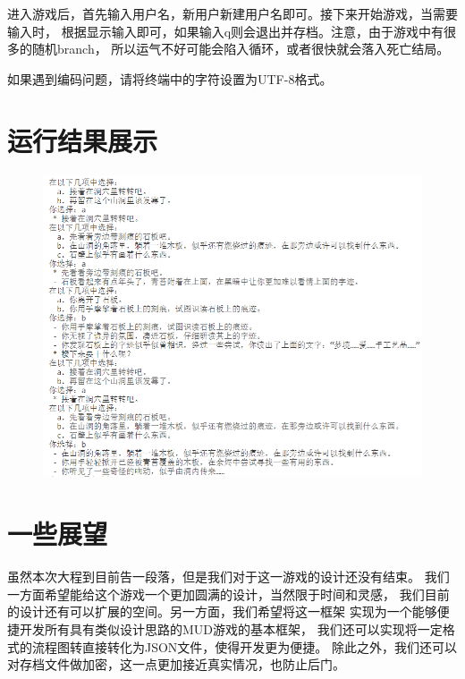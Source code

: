 \documentclass[UTF8]{ctexart}
\begin{document}
    进入游戏后，首先输入用户名，新用户新建用户名即可。接下来开始游戏，当需要输入时，
    根据显示输入即可，如果输入q则会退出并存档。注意，由于游戏中有很多的随机branch，
    所以运气不好可能会陷入循环，或者很快就会落入死亡结局。
    
    如果遇到编码问题，请将终端中的字符设置为UTF-8格式。

    \section{运行结果展示}
    \begin{figure}[h]
        \centering
        \includegraphics[scale=0.45]{1.png}
    \end{figure}

    \section{一些展望}
    虽然本次大程到目前告一段落，但是我们对于这一游戏的设计还没有结束。
    我们一方面希望能给这个游戏一个更加圆满的设计，当然限于时间和灵感，
    我们目前的设计还有可以扩展的空间。另一方面，我们希望将这一框架
    实现为一个能够便捷开发所有具有类似设计思路的MUD游戏的基本框架，
    我们还可以实现将一定格式的流程图转直接转化为JSON文件，使得开发更为便捷。
    除此之外，我们还可以对存档文件做加密，这一点更加接近真实情况，也防止后门。
\end{document}
